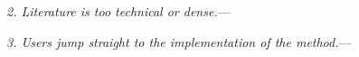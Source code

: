 \documentclass[a4paper,12pt]{article}
\renewcommand{\subsubsection}[1]{%
\vspace{2ex}
\noindent
\textit{#1.}---}
\begin{document}

\subsubsection{2. Literature is too technical or dense}


\subsubsection{3. Users jump straight to the implementation of the method}
\end{document}
